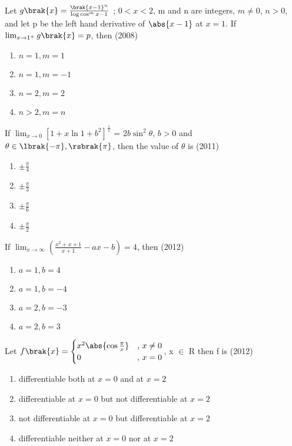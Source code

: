 \iffalse
\title{Assignment-1}
\author{EE24BTECH11048-NITHIN.K}
\section{mcq-single}
\fi
	\item Let $g\brak{x}= \frac{\brak{x-1}^n}{\log{\cos^m{x-1}}}$ ; $0<x<2$, m and n are integers, $m\neq0$, $n>0$, and let p be the left hand derivative of $\abs{x-1}$ at $x=1$. If $\lim_{x \to 1^
		+}
		{g\brak{x}=p}$, then \hfill{(2008)}
		\begin{enumerate}
			\item $n=1,m=1$
			\item $n=1,m=-1$
			\item $n=2,m=2$
			\item $n>2,m=n$
		\end{enumerate}
	\item If $\lim_{x \to 0}[1+x\ln{1+b^2}]^\frac{1}{x}$ = $2b\sin^2{\theta}$, $b>0$ and $\theta \in \lbrak{-\pi},\rsbrak{\pi}$, then the value of $\theta$ is \hfill{(2011)}
		\begin{enumerate}
			\item $\pm\frac{\pi}{4}$
			\item $\pm\frac{\pi}{3}$
			\item $\pm\frac{\pi}{6}$
			\item $\pm\frac{\pi}{2}$ 
		\end{enumerate}
	\item If $\lim_{ x \to \infty}(\frac{x^2+x+1}{x+1}-ax-b) = 4$, then \hfill{(2012)}
		\begin{enumerate}
			\item $a=1,b=4$
			\item $a=1,b=-4$
			\item $a=2,b=-3$
			\item $a=2,b=3$ 
		\end{enumerate}
	\item Let $f\brak{x} =\begin{cases} x^2\abs{\cos{\frac{\pi}{x}}} & \text{, } x \neq 0 \\ 0 & \text{, } x = 0 \end{cases}$, x $\in$ R then f is \hfill{(2012)}
		\begin{enumerate}
			\item differentiable both at $x=0$ and at $x=2$
			\item differentiable at $x=0$ but not differentiable at $x=2$
			\item not differentiable at $x=0$ but differentiable at $x=2$
			\item differentiable neither at $x=0$ nor at $x=2$ 
		\end{enumerate}
